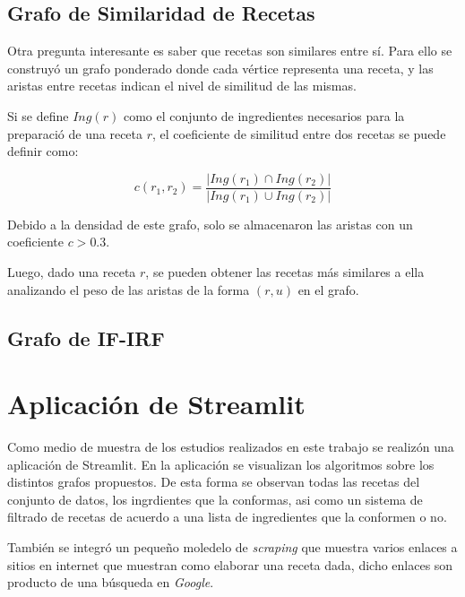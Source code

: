 \documentclass[a4paper]{article}
\begin{document}
\subsection{Grafo de Similaridad de Recetas}\label{sub:sim-rec-graph}

Otra pregunta interesante es saber que recetas son similares entre sí. Para
ello se construyó un grafo ponderado donde cada vértice representa una receta,
y las aristas entre recetas indican el nivel de similitud de las mismas.

Si se define $Ing(r)$ como el conjunto de ingredientes necesarios para la preparació
de una receta $r$, el coeficiente de similitud entre dos recetas se puede definir como:

$$ c(r_1, r_2) = \frac{|Ing(r_1) \cap Ing(r_2)|}{|Ing(r_1) \cup Ing(r_2)|}$$

Debido a la densidad de este grafo, solo se almacenaron las aristas con un 
coeficiente $c > 0.3$.

Luego, dado una receta $r$, se pueden obtener las recetas más similares a ella
analizando el peso de las aristas de la forma $(r, u)$ en el grafo.

\subsection{Grafo de IF-IRF}\label{sub:sim-graph}

\section{Aplicación de Streamlit}\label{sec:app}

Como medio de muestra de los estudios realizados en este trabajo se realizón
una aplicación de Streamlit. En la aplicación se visualizan los algoritmos sobre
los distintos grafos propuestos. De esta forma se observan todas las recetas del
conjunto de datos, los ingrdientes que la conformas, asi como un sistema de
filtrado de recetas de acuerdo a una lista de ingredientes que la conformen o no.

También se integró un pequeño moledelo de \emph{scraping} que muestra varios
enlaces a sitios en internet que muestran como elaborar una receta dada, dicho
enlaces son producto de una búsqueda en \emph{Google}.
\end{document}
